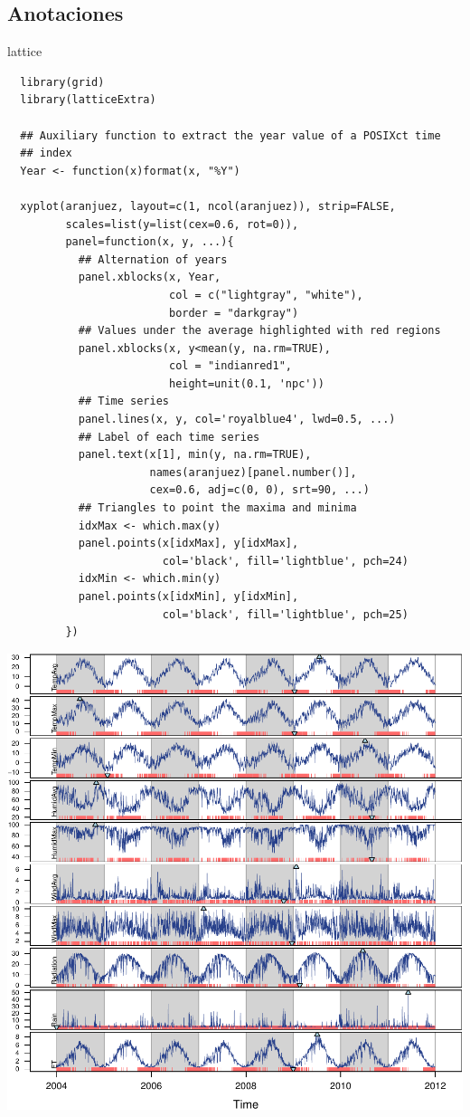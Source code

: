 \documentclass[xcolor={usenames,svgnames,dvipsnames}]{beamer}
\begin{document}
\subsection{Anotaciones}
\label{sec-2-3}
\begin{frame}[fragile,label=sec-2-3-1]{lattice}
 \lstset{language=R,label= ,caption= ,numbers=none}
\begin{lstlisting}
  library(grid)
  library(latticeExtra)
  
  ## Auxiliary function to extract the year value of a POSIXct time
  ## index
  Year <- function(x)format(x, "%Y")
  
  xyplot(aranjuez, layout=c(1, ncol(aranjuez)), strip=FALSE,
         scales=list(y=list(cex=0.6, rot=0)),
         panel=function(x, y, ...){
           ## Alternation of years
           panel.xblocks(x, Year,
                         col = c("lightgray", "white"),
                         border = "darkgray")
           ## Values under the average highlighted with red regions
           panel.xblocks(x, y<mean(y, na.rm=TRUE),
                         col = "indianred1",
                         height=unit(0.1, 'npc'))
           ## Time series
           panel.lines(x, y, col='royalblue4', lwd=0.5, ...)
           ## Label of each time series
           panel.text(x[1], min(y, na.rm=TRUE),
                      names(aranjuez)[panel.number()],
                      cex=0.6, adj=c(0, 0), srt=90, ...)
           ## Triangles to point the maxima and minima 
           idxMax <- which.max(y)
           panel.points(x[idxMax], y[idxMax],
                        col='black', fill='lightblue', pch=24)
           idxMin <- which.min(y)
           panel.points(x[idxMin], y[idxMin],
                        col='black', fill='lightblue', pch=25)
         })
\end{lstlisting}
\end{frame}

\begin{frame}[label=sec-2-3-2]{}
\includegraphics[width=.9\linewidth]{figs/aranjuezXblocks.pdf}
\end{frame}
\end{document}
